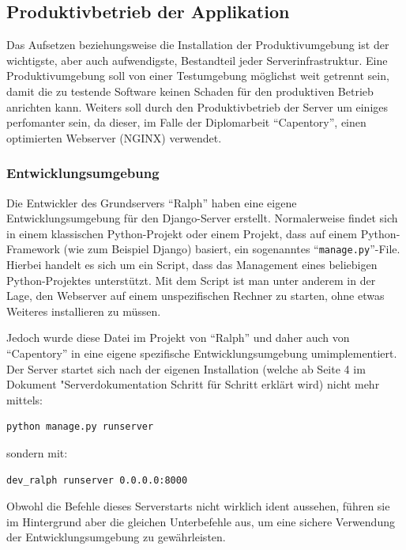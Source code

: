 \hypertarget{produktivbetrieb-der-applikation}{%
\subsection{Produktivbetrieb der
Applikation}\label{produktivbetrieb-der-applikation}}

Das Aufsetzen beziehungsweise die Installation der Produktivumgebung ist
der wichtigste, aber auch aufwendigste, Bestandteil jeder
Serverinfrastruktur. Eine Produktivumgebung soll von einer Testumgebung
möglichst weit getrennt sein, damit die zu testende Software keinen
Schaden für den produktiven Betrieb anrichten kann. Weiters soll durch
den Produktivbetrieb der Server um einiges perfomanter sein, da dieser,
im Falle der Diplomarbeit ``Capentory'', einen optimierten Webserver
(NGINX) verwendet.

\hypertarget{entwicklungsumgebung}{%
\subsubsection{Entwicklungsumgebung}\label{entwicklungsumgebung}}

Die Entwickler des Grundservers ``Ralph'' haben eine eigene
Entwicklungsumgebung für den Django-Server erstellt. Normalerweise
findet sich in einem klassischen Python-Projekt oder einem Projekt, dass
auf einem Python-Framework (wie zum Beispiel Django) basiert, ein
sogenanntes ``\texttt{manage.py}''-File. Hierbei handelt es sich um ein
Script, dass das Management eines beliebigen Python-Projektes
unterstützt. Mit dem Script ist man unter anderem in der Lage, den
Webserver auf einem unspezifischen Rechner zu starten, ohne etwas
Weiteres installieren zu müssen.

Jedoch wurde diese Datei im Projekt von ``Ralph'' und daher auch von
``Capentory'' in eine eigene spezifische Entwicklungsumgebung
umimplementiert. Der Server startet sich nach der eigenen Installation
(welche ab Seite 4 im Dokument "Serverdokumentation Schritt für Schritt
erklärt wird) nicht mehr mittels:

\begin{verbatim}
python manage.py runserver
\end{verbatim}

sondern mit:

\begin{verbatim}
dev_ralph runserver 0.0.0.0:8000
\end{verbatim}

Obwohl die Befehle dieses Serverstarts nicht wirklich ident aussehen,
führen sie im Hintergrund aber die gleichen Unterbefehle aus, um eine
sichere Verwendung der Entwicklungsumgebung zu gewährleisten.

